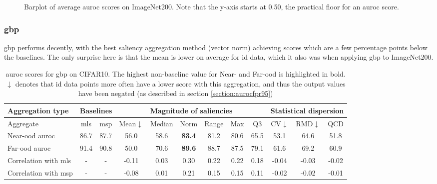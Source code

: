 \documentclass[UKenglish]{uiomasterthesis} %
\theoremstyle{definition}
\begin{document}
\begin{figure}[H]
    \begin{center}
        
    \end{center}
    \caption[Average scores]{Barplot of average \ac{auroc} scores on ImageNet200. Note that the y-axis starts at 0.50, the practical floor for an \ac{auroc} score.}
    \label{fig:cifar10_integratedgradients_mean_norm}
\end{figure}

\subsubsection{\ac*{gbp}}

\ac{gbp} performs decently, with the best saliency aggregation method (vector norm) achieving scores which are a few percentage points below the baselines. The only surprise here is that the mean is lower on average for \ac{id} data, which it also was when applying \ac{gbp} to ImageNet200.

\begin{table}[H]
\setlength\tabcolsep{3pt}
\begin{center}
\begin{tabular}{ |p{5.1em}|c c|c c c c c c|c c c| }
    \hline
     \centering Aggregation type & \multicolumn{2}{c|}{Baselines} & \multicolumn{6}{c|}{Magnitude of saliencies} & \multicolumn{3}{p{8em}|}{\centering Statistical dispersion} \\
    \hline
    Aggregate & \ac{mls} & \ac{msp} & Mean$\downarrow$ & Median & Norm & Range & Max & Q3 & CV$\downarrow$ & RMD$\downarrow$ & QCD  \\
    \hline
    \rowcolor{near!50}
    Near-\ac{ood} \ac{auroc} & 86.7 & 87.7 & 56.0 & 58.6 &\textbf{ 83.4 }& 81.2 & 80.6 & 65.5 & 53.1 & 64.6 & 51.8  \\
    \hline
    \rowcolor{far!50}
    Far-\ac{ood} \ac{auroc} & 91.4 & 90.8 & 50.0 & 70.6 &\textbf{ 89.6 }& 88.7 & 87.5 & 79.1 & 61.6 & 69.2 & 60.9  \\
    \hline
    Correlation with \ac{mls}& - & - & -0.11 & 0.03 & 0.30 & 0.22 & 0.22 & 0.18 & -0.04 & -0.03 & -0.02  \\
    \hline
    Correlation with \ac{msp}& - & - & -0.08 & 0.01 & 0.21 & 0.15 & 0.15 & 0.11 & -0.02 & -0.02 & -0.01  \\
    \hline
    \end{tabular}
    \caption[\ac{auroc} scores for \ac{gbp} on CIFAR10]{\ac{auroc} scores for \ac{gbp} on CIFAR10. The highest non-baseline value for Near- and Far-\ac{ood} is highlighted in bold. $\downarrow$ denotes that \ac{id} data points more often have a lower score with this aggregation, and thus the output values have been negated (as described in section \ref{section:aurocfpr95})}
    \label{table:cifar10_gbp_metrics}
\end{center}
\setlength\tabcolsep{6pt}
\end{table}
\end{document}
